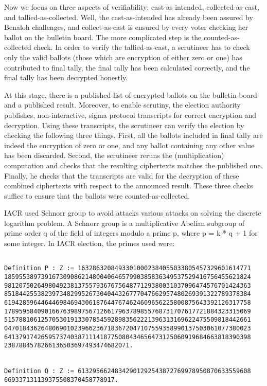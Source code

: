 Now we focus on three aspects of verifiability: cast-as-intended, collected-as-cast, 
and tallied-as-collected. Well, the cast-as-intended has already been assured 
by Benaloh challenges, and collect-as-cast is ensured by every voter 
checking her ballot on the bulletin board. 
The more complicated step is the counted-as-collected
check.  In order to verify the tallied-as-cast, a scrutineer has to check 
only the valid ballots (those which are encryption of either zero or one) 
has contributed to final tally, the final tally has been calculated 
correctly, and the final tally has been decrypted honestly. 

At this stage, there is a published list of encrypted ballots on the bulletin board
and a published result.  Moreover, to enable scrutiny, the election authority publishes, 
non-interactive, sigma protocol transcripts for correct encryption and decryption. 
Using these transcripts,  the scrutineer can verify the election by checking the following
three things. First, all the ballots included in final tally are indeed the encryption of 
zero or one, and any ballot containing any other value has been discarded. 
Second, the scrutineer reruns the (multiplication)
computation and checks that the resulting ciphertexts matches the published one.
Finally, he checks that the transcripts are valid for the decryption of these
combined ciphertexts with respect to the announced result.  These  three checks
suffice to ensure that the ballots were counted-as-collected. 


IACR used Schnorr group to avoid attacks various attacks on solving the discrete 
logarithm problem.  A Schnorr group is a multiplicative Abelian subgroup of prime order q of the field of 
integers modulo a prime p, where p = k * q + 1 for some integer.   In IACR election, 
the primes used were:
\begin{lstlisting}[frame=single,basicstyle=\ttfamily\scriptsize]

Definition P : Z := 16328632084933010002384055033805457329601614771
1859553897391673090862148004064657990385836349537529416756455621824
9812075026498049238137557936767564877129380031037096474576701424363
8518442553823973482995267304044326777047662957480269391322789378384
6194285964464469846943061876447674624609656225800875643392126317758
1789595840901667639897567126617963789855768731707617721884323315069
5157881061257053019133078545928983562221396313169622475509818442661
0470184362648069010239662367183672047107559358990137503061077380023
6413791742659573740387111418775080434656473125060919684663818390398
2387884578266136503697493474682071.


Definition Q : Z := 61329566248342901292543872769978950870633559608
669337131139375508370458778917.


\end{lstlisting}

